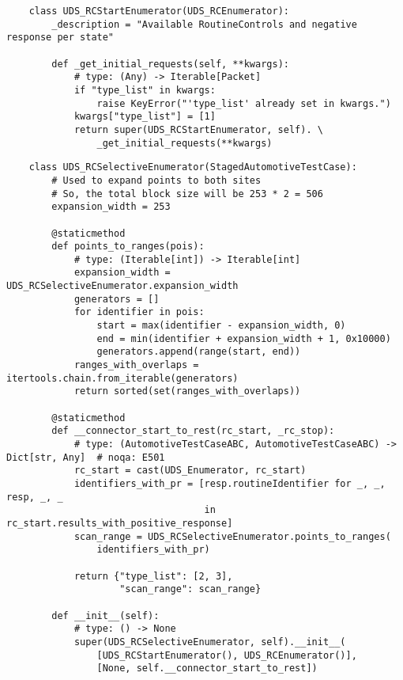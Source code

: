     
\begin{verbatim}
    class UDS_RCStartEnumerator(UDS_RCEnumerator):
        _description = "Available RoutineControls and negative response per state"
    
        def _get_initial_requests(self, **kwargs):
            # type: (Any) -> Iterable[Packet]
            if "type_list" in kwargs:
                raise KeyError("'type_list' already set in kwargs.")
            kwargs["type_list"] = [1]
            return super(UDS_RCStartEnumerator, self). \
                _get_initial_requests(**kwargs)
\end{verbatim}

\begin{verbatim}
    class UDS_RCSelectiveEnumerator(StagedAutomotiveTestCase):
        # Used to expand points to both sites
        # So, the total block size will be 253 * 2 = 506
        expansion_width = 253
    
        @staticmethod
        def points_to_ranges(pois):
            # type: (Iterable[int]) -> Iterable[int]
            expansion_width = UDS_RCSelectiveEnumerator.expansion_width
            generators = []
            for identifier in pois:
                start = max(identifier - expansion_width, 0)
                end = min(identifier + expansion_width + 1, 0x10000)
                generators.append(range(start, end))
            ranges_with_overlaps = itertools.chain.from_iterable(generators)
            return sorted(set(ranges_with_overlaps))
    
        @staticmethod
        def __connector_start_to_rest(rc_start, _rc_stop):
            # type: (AutomotiveTestCaseABC, AutomotiveTestCaseABC) -> Dict[str, Any]  # noqa: E501
            rc_start = cast(UDS_Enumerator, rc_start)
            identifiers_with_pr = [resp.routineIdentifier for _, _, resp, _, _
                                   in rc_start.results_with_positive_response]
            scan_range = UDS_RCSelectiveEnumerator.points_to_ranges(
                identifiers_with_pr)
    
            return {"type_list": [2, 3],
                    "scan_range": scan_range}
    
        def __init__(self):
            # type: () -> None
            super(UDS_RCSelectiveEnumerator, self).__init__(
                [UDS_RCStartEnumerator(), UDS_RCEnumerator()],
                [None, self.__connector_start_to_rest])
    
\end{verbatim}


